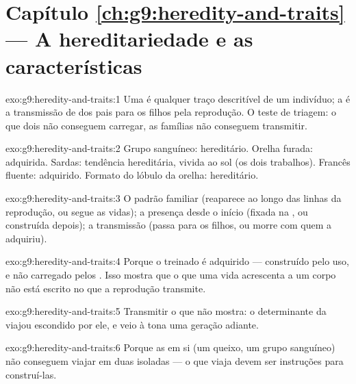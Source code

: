 \section*{Capítulo \ref{ch:g9:heredity-and-traits} --- A hereditariedade e as características}

\begin{solution}{exo:g9:heredity-and-traits:1}
Uma  é qualquer traço descritível de um
indivíduo; a  é a transmissão de
 dos pais para os filhos pela reprodução. O
teste de triagem: o que dois  não conseguem carregar,
as famílias não conseguem transmitir.
\end{solution}

\begin{solution}{exo:g9:heredity-and-traits:2}
Grupo sanguíneo: hereditário. Orelha furada: adquirida.
Sardas: tendência hereditária, vivida ao sol (os dois
trabalhos). Francês fluente: adquirido. Formato do lóbulo da
orelha: hereditário.
\end{solution}

\begin{solution}{exo:g9:heredity-and-traits:3}
O padrão familiar (reaparece ao longo das linhas da
reprodução, ou segue as vidas); a presença desde o início
(fixada na , ou construída depois); a transmissão
(passa para os filhos, ou morre com quem a adquiriu).
\end{solution}

\begin{solution}{exo:g9:heredity-and-traits:4}
Porque o  treinado é adquirido --- construído pelo
uso, e não carregado pelos . Isso mostra que o que
uma vida acrescenta a um corpo não está escrito no que a
reprodução transmite.
\end{solution}

\begin{solution}{exo:g9:heredity-and-traits:5}
Transmitir o que não mostra: o determinante da
 viajou escondido por ele, e veio à tona uma
geração adiante.
\end{solution}

\begin{solution}{exo:g9:heredity-and-traits:6}
Porque as  em si (um queixo, um grupo
sanguíneo) não conseguem viajar em duas  isoladas ---
o que viaja devem ser instruções para construí-las.
\end{solution}

